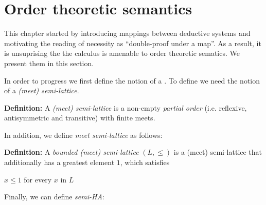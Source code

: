 			
			
			
			
			\section{Order theoretic semantics}
			This chapter started by introducing 
			mappings between deductive systems and 
			motivating the reading of necessity as ``double-proof under a map''.
			As a result, it is unsuprising the the calculus is amenable to order theoretic sematics.
			We present them in this section.

			In order to progress we first define the notion of a . 
			To define  we need the notion of a \emph{(meet) semi-lattice}.
			  
			
			\begin{mdframed}
			\textbf{Definition:}
			A \textit{(meet) semi-lattice} is a non-empty \emph{partial order} (i.e. reflexive, antisymmetric and transitive) 
			with finite meets.
			\end{mdframed}
			In addition, we define \emph{meet semi-lattice} as follows: 
			\begin{mdframed}
			\textbf{Definition:}
			A \textit{bounded (meet) semi-lattice} $(L,\le)$ is a (meet) semi-lattice that additionally has 
			a greatest element $1$, which satisfies
			
			$x \le 1$ for every $x$ in $L$
			\end{mdframed}
			Finally, we can define \emph{semi-HA}:
			

